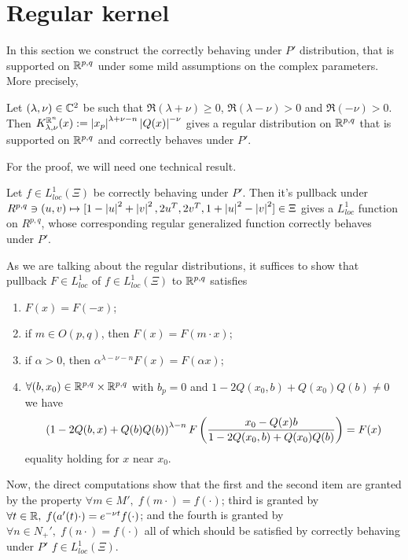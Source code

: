 \documentclass[10pt]{article} %
\theoremstyle{definition}
\theoremstyle{remark}
\begin{document}
\section{Regular kernel}
In this section we construct the correctly behaving under $P'$ distribution, that is supported on $\mathbb{R}^{ p,q }$ under some mild
assumptions on the complex parameters. More precisely,
\begin{myprop}
	Let $(\lambda,\nu)\in\mathbb{C}^2$ be such that $\Re(\lambda+\nu)\geq0$, $\Re(\lambda-\nu)>0$ and $\Re(-\nu)>0$. Then
	$K_{ \lambda,\nu }^{ \mathbb{R}^n }(x):=\left| x_p\right|^{ \lambda+\nu-n }\left| Q(x) \right|^{ -\nu }$ gives a regular distribution
	on $\mathbb{R}^{ p,q }$ that is supported on $\mathbb{R}^{ p,q }$ and correctly behaves under $P'$.
\end{myprop}
For the proof, we will need one technical result.
\begin{mylem}
	Let $f\in L^1_{loc}(\Xi)$ be correctly behaving under $P'$. Then it's pullback under $R^{p,q}\ni(u,v)\mapsto
	[1-\left| u \right|^2+\left| v \right|^2,2u^T,2v^T,1+\left| u \right|^2-\left| v \right|^2]\in\Xi$ gives a $L^1_{loc}$ function
	on $R^{p,q}$, whose corresponding regular generalized function correctly behaves under $P'$.
\end{mylem}
\begin{myproof}
	As we are talking about the regular distributions, it suffices to show that pullback $F\in L^1_{loc}$
	of $f\in L^1_{loc}(\Xi)$ to $\mathbb{R}^{p,q}$
	satisfies
	\begin{enumerate}
		\item $F(x)=F(-x)$;
		\item if $m\in O(p,q)$, then $F(x)=F(m\cdot x)$;
		\item if $\alpha>0$, then $\alpha^{\lambda-\nu-n}F(x)=F(\alpha x)$;
		\item $\forall (b,x_0)\in\mathbb{R}^{ p,q }\times\mathbb{R}^{p,q}$ with $b_p=0$ and
				${ 1-2Q(x_0,b)+Q(x_0)Q(b) }\neq0$
				we have \[\left( 1-2Q(b,x)+Q(b)Q(b) \right)^{ \lambda-n }F
				\left(\frac{ x_0-Q(x)b }{ 1-2Q(x_0,b)+Q(x_0)Q(b)}\right)=F(x)\] equality holding for $x$ near $x_0$.
	\end{enumerate}
	Now, the direct computations show that the first and the second item are granted by the property
	$\forall m\in M',\;f(m\cdot)=f(\cdot)$;
	third is granted by $\forall t\in\mathbb{R},\;f(a'(t)\cdot)=e^{-\nu t}f(\cdot)$;
	and the fourth is granted by $\forall n\in N_+',\;f(n\cdot)=f(\cdot)$ all of which
	should be satisfied by correctly behaving under $P'$ $f\in L^1_{loc}(\Xi)$.
\end{myproof}
\end{document}
